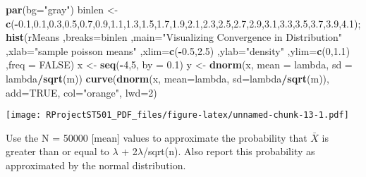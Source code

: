 \documentclass[
]{article}
\newenvironment{Shaded}{\begin{snugshade}}{\end{snugshade}}
\newcommand{\DataTypeTok}[1]{\textcolor[rgb]{0.13,0.29,0.53}{#1}}
\newcommand{\DecValTok}[1]{\textcolor[rgb]{0.00,0.00,0.81}{#1}}
\newcommand{\FloatTok}[1]{\textcolor[rgb]{0.00,0.00,0.81}{#1}}
\newcommand{\KeywordTok}[1]{\textcolor[rgb]{0.13,0.29,0.53}{\textbf{#1}}}
\newcommand{\NormalTok}[1]{#1}
\newcommand{\OperatorTok}[1]{\textcolor[rgb]{0.81,0.36,0.00}{\textbf{#1}}}
\newcommand{\OtherTok}[1]{\textcolor[rgb]{0.56,0.35,0.01}{#1}}
\newcommand{\StringTok}[1]{\textcolor[rgb]{0.31,0.60,0.02}{#1}}
\begin{document}
\begin{Shaded}
\begin{Highlighting}[]
\KeywordTok{par}\NormalTok{(}\DataTypeTok{bg=}\StringTok{"gray"}\NormalTok{)}
\NormalTok{binlen <-}\StringTok{ }\KeywordTok{c}\NormalTok{(}\OperatorTok{-}\FloatTok{0.1}\NormalTok{,}\FloatTok{0.1}\NormalTok{,}\FloatTok{0.3}\NormalTok{,}\FloatTok{0.5}\NormalTok{,}\FloatTok{0.7}\NormalTok{,}\FloatTok{0.9}\NormalTok{,}\FloatTok{1.1}\NormalTok{,}\FloatTok{1.3}\NormalTok{,}\FloatTok{1.5}\NormalTok{,}\FloatTok{1.7}\NormalTok{,}\FloatTok{1.9}\NormalTok{,}\FloatTok{2.1}\NormalTok{,}\FloatTok{2.3}\NormalTok{,}\FloatTok{2.5}\NormalTok{,}\FloatTok{2.7}\NormalTok{,}\FloatTok{2.9}\NormalTok{,}\FloatTok{3.1}\NormalTok{,}\FloatTok{3.3}\NormalTok{,}\FloatTok{3.5}\NormalTok{,}\FloatTok{3.7}\NormalTok{,}\FloatTok{3.9}\NormalTok{,}\FloatTok{4.1}\NormalTok{);}
\KeywordTok{hist}\NormalTok{(rMeans ,}\DataTypeTok{breaks=}\NormalTok{binlen ,}\DataTypeTok{main=}\StringTok{"Visualizing Convergence in Distribution"}\NormalTok{ ,}\DataTypeTok{xlab=}\StringTok{"sample poisson means"}\NormalTok{ ,}\DataTypeTok{xlim=}\KeywordTok{c}\NormalTok{(}\OperatorTok{-}\FloatTok{0.5}\NormalTok{,}\FloatTok{2.5}\NormalTok{) ,}\DataTypeTok{ylab=}\StringTok{"density"}\NormalTok{ ,}\DataTypeTok{ylim=}\KeywordTok{c}\NormalTok{(}\DecValTok{0}\NormalTok{,}\FloatTok{1.1}\NormalTok{) ,}\DataTypeTok{freq =} \OtherTok{FALSE}\NormalTok{)}
\NormalTok{x <-}\StringTok{ }\KeywordTok{seq}\NormalTok{(}\OperatorTok{-}\DecValTok{4}\NormalTok{,}\DecValTok{5}\NormalTok{, }\DataTypeTok{by =} \FloatTok{0.1}\NormalTok{)}
\NormalTok{y <-}\StringTok{ }\KeywordTok{dnorm}\NormalTok{(x, }\DataTypeTok{mean =}\NormalTok{ lambda, }\DataTypeTok{sd =}\NormalTok{ lambda}\OperatorTok{/}\KeywordTok{sqrt}\NormalTok{(m))}
\KeywordTok{curve}\NormalTok{(}\KeywordTok{dnorm}\NormalTok{(x, }\DataTypeTok{mean=}\NormalTok{lambda, }\DataTypeTok{sd=}\NormalTok{lambda}\OperatorTok{/}\KeywordTok{sqrt}\NormalTok{(m)), }\DataTypeTok{add=}\OtherTok{TRUE}\NormalTok{, }\DataTypeTok{col=}\StringTok{"orange"}\NormalTok{, }\DataTypeTok{lwd=}\DecValTok{2}\NormalTok{)}
\end{Highlighting}
\end{Shaded}

\texttt{[image: RProjectST501\_PDF\_files/figure-latex/unnamed-chunk-13-1.pdf]}

Use the N = 50000 {[}mean{]} values to approximate the probability that
\(\bar{X}\) is greater than or equal to \(\lambda\) +
2\(\lambda\)/sqrt(n). Also report this probability as approximated by
the normal distribution.
\end{document}

